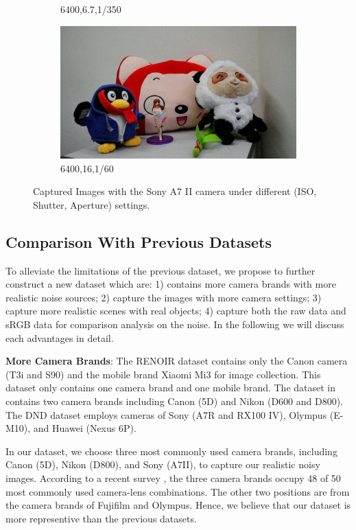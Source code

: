 \begin{figure}
\begin{subfigure}[t]{0.32\textwidth}
		\caption{6400,6.7,1/350}
    \end{subfigure}
    \hfill
    \begin{subfigure}[t]{0.32\textwidth}
        \centering
        \includegraphics[width=1\textwidth]{images/dataset/6400_16_1-60.jpg}
		\caption{6400,16,1/60}
    \end{subfigure}
    \caption{Captured Images with the Sony A7 II camera under different (ISO, Shutter, Aperture) settings.}
    \label{fig6-1}
\end{figure}


\subsection{Comparison With Previous Datasets}

To alleviate the limitations of the previous dataset, we propose to further construct a new dataset which are: 1) contains more camera brands with more realistic noise sources;  2) capture the images with more camera settings; 3) capture more realistic scenes with real objects; 4) capture both the raw data and sRGB data for comparison analysis on the noise. In the following we will discuss each advantages in detail.

\textbf{More Camera Brands}: The RENOIR dataset \cite{RENOIR2014} contains only the Canon camera (T3i and S90) and the mobile brand Xiaomi Mi3 for image collection. This dataset only contains one camera brand and one mobile brand. The dataset in \cite{crosschannel2016} contains two camera brands including Canon (5D) and Nikon (D600 and D800). The DND dataset \cite{dnd2017} employs cameras of Sony (A7R and RX100 IV),  Olympus (E-M10), and Huawei (Nexus 6P).

In our dataset, we choose three most commonly used camera brands, including Canon (5D), Nikon (D800), and Sony (A7II), to capture our realistic noisy images. According to a recent survey \cite{commoncamera}, the three camera brands occupy 48 of 50 most commonly used camera-lens combinations. The other two positions are from the camera brands of Fujifilm and Olympus. Hence, we believe that our dataset is more representive than the previous datasets.

